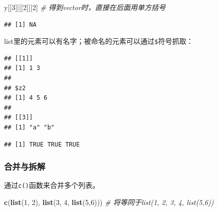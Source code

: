 \documentclass[]{book}
\newenvironment{Shaded}{\begin{snugshade}}{\end{snugshade}}
\newcommand{\CommentTok}[1]{\textcolor[rgb]{0.56,0.35,0.01}{\textit{#1}}}
\newcommand{\DataTypeTok}[1]{\textcolor[rgb]{0.13,0.29,0.53}{#1}}
\newcommand{\DecValTok}[1]{\textcolor[rgb]{0.00,0.00,0.81}{#1}}
\newcommand{\KeywordTok}[1]{\textcolor[rgb]{0.13,0.29,0.53}{\textbf{#1}}}
\newcommand{\NormalTok}[1]{#1}
\newcommand{\OperatorTok}[1]{\textcolor[rgb]{0.81,0.36,0.00}{\textbf{#1}}}
\newcommand{\StringTok}[1]{\textcolor[rgb]{0.31,0.60,0.02}{#1}}
\begin{document}
\begin{Shaded}
\begin{Highlighting}[]
\NormalTok{y[[}\DecValTok{3}\NormalTok{]][[}\DecValTok{2}\NormalTok{]][}\DecValTok{2}\NormalTok{] }\CommentTok{# 得到vector时，直接在后面用单方括号}
\end{Highlighting}
\end{Shaded}

\begin{verbatim}
## [1] NA
\end{verbatim}

list里的元素可以有名字；被命名的元素可以通过\texttt{\$}符号抓取：

\begin{Shaded}
\end{Shaded}

\begin{verbatim}
## [[1]]
## [1] 1 3
## 
## $z2
## [1] 4 5 6
## 
## [[3]]
## [1] "a" "b"
\end{verbatim}

\begin{Shaded}
\end{Shaded}

\begin{verbatim}
## [1] TRUE TRUE TRUE
\end{verbatim}

\subsubsection{合并与拆解}

通过\texttt{c()}函数来合并多个列表。

\begin{Shaded}
\begin{Highlighting}[]
\KeywordTok{c}\NormalTok{(}\KeywordTok{list}\NormalTok{(}\DecValTok{1}\NormalTok{, }\DecValTok{2}\NormalTok{), }\KeywordTok{list}\NormalTok{(}\DecValTok{3}\NormalTok{, }\DecValTok{4}\NormalTok{, }\KeywordTok{list}\NormalTok{(}\DecValTok{5}\NormalTok{,}\DecValTok{6}\NormalTok{)))}
\CommentTok{# 将等同于list(1, 2, 3, 4, list(5,6))}
\end{Highlighting}
\end{Shaded}
\end{document}
